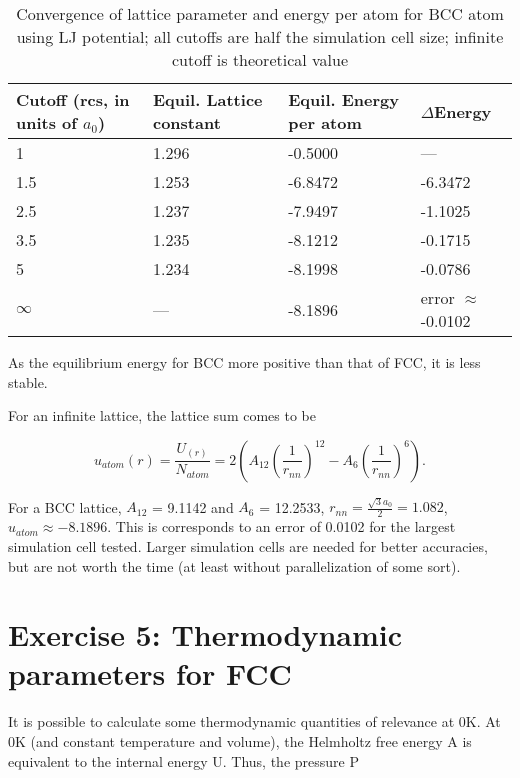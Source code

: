 \documentclass[12pt, oneside]{article}
\begin{document}
 \begin{table}[htbp]
\centering
\caption{Convergence of lattice parameter and energy per atom for BCC atom using LJ potential; all cutoffs are half the simulation cell size; infinite cutoff is theoretical value}
\label{tab:bcconv}
	\begin{tabular}{llll}
	\hline \hline
                 Cutoff (rcs, in units of $a_0$) &  Equil. Lattice constant & Equil. Energy per atom  & $\Delta$Energy \\
                 \hline 
    		   1	&  1.296	&  -0.5000 	& ---	\\
                   1.5	&  1.253	&  -6.8472  	& -6.3472	\\
                   2.5	&  1.237	&  -7.9497  	& -1.1025	\\
                   3.5	&  1.235	&  -8.1212  	& -0.1715	\\
                    5	&  1.234	&  -8.1998   	& -0.0786	\\
	  \hline
	       $\infty$     & ---	&  -8.1896 	& error $\approx$ -0.0102 \\
          \hline \hline	
\end{tabular}
\end{table}


As the equilibrium energy for BCC more positive than that of FCC, it is less stable. 

For an infinite lattice, the lattice sum comes to be 

\begin{equation} 
  u_{atom}(r) = \frac{U_(r)}{N_{atom}}= 2(A_{12}(\frac{1}{r_{nn}})^{12} - A_{6}(\frac{1}{r_{nn}})^6).
\end{equation}  

For a BCC lattice, $A_{12}$ = 9.1142 and $A_{6}$ = 12.2533, $r_{nn} = \frac{\sqrt{3}a_0}{2} = 1.082 $, $ u_{atom} \approx -8.1896.$ This is corresponds to an error of 0.0102 for the largest simulation cell tested. Larger simulation cells are needed for better accuracies, but are not worth the time (at least without parallelization of some sort). 

\section{Exercise 5: Thermodynamic parameters for FCC}

It is possible to calculate some thermodynamic quantities of relevance at 0K. At 0K (and constant temperature and volume), the Helmholtz free energy A is equivalent to the internal energy U. Thus, the pressure P
\end{document}
